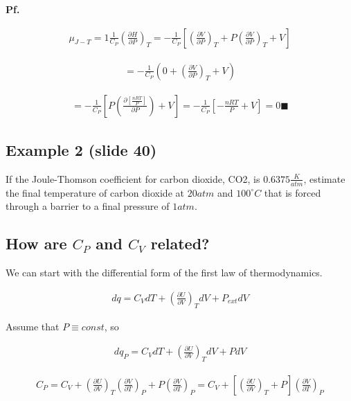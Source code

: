 \documentclass[12pt]{book}
\begin{document}
\textbf{Pf.}

\begin{align*}
    \mu_{J-T}=1\frac{1}{C_P}\left(\frac{\partial H}{\partial P}\right)_T=-\frac{1}{C_P}\left[\left(\frac{\partial V}{\partial P}\right)_T+P\left(\frac{\partial V}{\partial P}\right)_T+V\right]
\end{align*}

\begin{align*}
    =-\frac{1}{C_P}\left(0+{\left(\frac{\partial V}{\partial P}\right)_T}+V\right)
\end{align*}

\begin{align*}
    =-\frac{1}{C_P}\left[P(\frac{\partial\left[\frac{nRT}{P}\right]}{\partial P})+V\right]=-\frac{1}{C_P}\left[-\frac{nRT}{P} +V\right]=0 \blacksquare
\end{align*}
\subsection*{Example 2 (slide 40)}

If the Joule-Thomson coefficient for carbon dioxide, CO2, is $0.6375 \frac{K}{atm}$, estimate
the final temperature of carbon dioxide at $20atm$ and $100^{\circ}C$ that is forced through
a barrier to a final pressure of $1atm$.

\subsection*{How are $C_P$ and $C_V$ related?}

We can start with the differential form of the first law of thermodynamics.

\begin{align*}
    dq=C_VdT+\left(\frac{\partial U}{\partial V}\right)_T dV+P_{ext}dV
\end{align*}

Assume that $P\equiv const$, so

\begin{align*}
    dq_P=C_V dT+\left(\frac{\partial U}{\partial V}\right)_T dV+PdV
\end{align*}

\begin{align*}
    C_P=C_V+\left(\frac{\partial U}{\partial V}\right)_T\left(\frac{\partial V}{\partial T}\right)_P+P\left(\frac{\partial V}{\partial T}\right)_P=C_V+\left[\left(\frac{\partial U}{\partial V}\right)_T+P\right]\left(\frac{\partial V}{\partial T}\right)_P
\end{align*}
\end{document}

